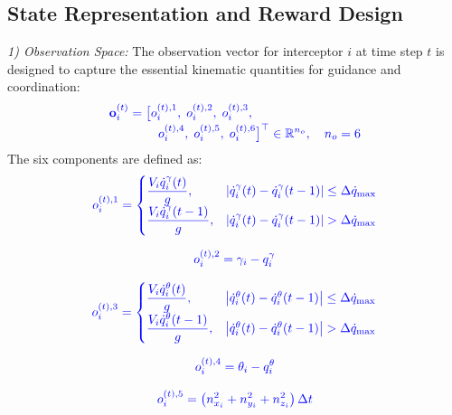\documentclass[lettersize,journal]{IEEEtran}
\newcommand{\hladd}[1]{{\color{blue}#1}}
\begin{document}
\subsection{State Representation and Reward Design}
\label{subsec:state_reward}

\emph{1) Observation Space:} The observation vector for interceptor $i$ at time step $t$ is designed to capture the essential kinematic quantities for guidance and coordination:
\begin{equation}
\label{eq:observation_space}
\hladd{\begin{aligned}
\mathbf{o}_i^{(t)}={}&\bigl[o_i^{(t),1},\;o_i^{(t),2},\;o_i^{(t),3},\\[-2pt]
&\quad o_i^{(t),4},\;o_i^{(t),5},\;o_i^{(t),6}\bigr]^\top\in\mathbb{R}^{n_o},\quad n_o=6
\end{aligned}}
\end{equation}
\hladd{The six components are defined as:}
\begin{equation}
\label{eq:o1}
\hladd{
o_i^{(t),1} =
\begin{cases}
\dfrac{V_i \dot{q}_i^{\gamma}(t)}{g}, &
\left|\dot{q}_i^{\gamma}(t) - \dot{q}_i^{\gamma}(t-1)\right|
\leq \Delta \dot{q}_{\max}
\\[0pt]
\dfrac{V_i \dot{q}_i^{\gamma}(t-1)}{g}, &
\left|\dot{q}_i^{\gamma}(t) - \dot{q}_i^{\gamma}(t-1)\right|
> \Delta \dot{q}_{\max}
\end{cases}
}
\end{equation}

\begin{equation}
\label{eq:o2}
\hladd{
o_i^{(t),2} = \gamma_i-q_i^{\gamma}
}
\end{equation}

\begin{equation}
\label{eq:o3}
\hladd{
o_i^{(t),3} =
\begin{cases}
\dfrac{V_i \dot{q}_i^{\theta}(t)}{g}, &
\left|\dot{q}_i^{\theta}(t) - \dot{q}_i^{\theta}(t-1)\right|
\leq \Delta \dot{q}_{\max}
\\[0pt]
\dfrac{V_i \dot{q}_i^{\theta}(t-1)}{g}, &
\left|\dot{q}_i^{\theta}(t) - \dot{q}_i^{\theta}(t-1)\right|
> \Delta \dot{q}_{\max}
\end{cases}
}
\end{equation}

\begin{equation}
\label{eq:o4}
\hladd{
o_i^{(t),4} = \theta_i-q_i^{\theta}
}
\end{equation}

\begin{equation}
\label{eq:o5}
\hladd{
o_i^{(t),5}
=
\left(n_{x_i}^2+n_{y_i}^2+n_{z_i}^2\right)\Delta t
}
\end{equation}
\end{document}
